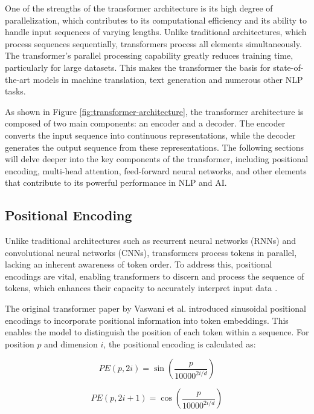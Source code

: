 One of the strengths of the transformer architecture is its high degree of parallelization, which contributes to its computational efficiency and its ability to handle input sequences of varying lengths. Unlike traditional architectures, which process sequences sequentially, transformers process all elements simultaneously. The transformer's parallel processing capability greatly reduces training time, particularly for large datasets. This makes the transformer the basis for state-of-the-art models in machine translation, text generation and numerous other NLP tasks.

As shown in Figure \ref{fig:transformer-architecture}, the transformer architecture is composed of two main components: an encoder and a decoder. The encoder converts the input sequence into continuous representations, while the decoder generates the output sequence from these representations. The following sections will delve deeper into the key components of the transformer, including positional encoding, multi-head attention, feed-forward neural networks, and other elements that contribute to its powerful performance in NLP and AI.

\subsection{Positional Encoding}

Unlike traditional architectures such as recurrent neural networks (RNNs) and convolutional neural networks (CNNs), transformers process tokens in parallel, lacking an inherent awareness of token order. To address this, positional encodings are vital, enabling transformers to discern and process the sequence of tokens, which enhances their capacity to accurately interpret input data \cite{li2023transformer}.

The original transformer paper by Vaswani et al. introduced sinusoidal positional encodings to incorporate positional information into token embeddings. This enables the model to distinguish the position of each token within a sequence. For position \( p \) and dimension \( i \), the positional encoding is calculated as:

\begin{equation}
    PE(p, 2i) = \sin\left(\frac{p}{10000^{2i/d}}\right)
\end{equation}

\begin{equation}
PE(p, 2i + 1) = \cos\left(\frac{p}{10000^{2i/d}}\right)
\end{equation}

